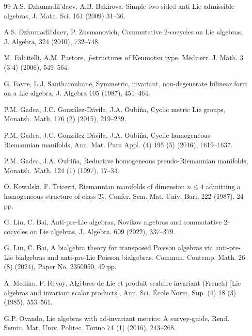 \documentclass[reqno]{amsart}
\theoremstyle{definition}
\begin{document}
\begin{thebibliography}{99}
 A.S. Dzhumadil'daev, A.B.  Bakirova, Simple two-sided anti-Lie-admissible algebras, J. Math. Sci. 161
(2009) 31--36.

 A.S. Dzhumadil'daev, P. Zusmanovich, Commutative 2-cocycles on Lie algebras, J. Algebra, 324 (2010), 732--748.

  M. Falcitelli, A.M. Pastore, $f$-structures of Kenmotsu type,
 Mediterr. J. Math. 3 (3-4) (2006), 549--564.

 G. Favre, L.J. Santharoubane, Symmetric, invariant, non-degenerate bilinear form on a Lie algebra, J. Algebra 105 (1987), 451--464.


 P.M. Gadea, J.C. Gonz\'{a}lez-D\'{a}vila, J.A. Oubi\~{n}a, Cyclic metric Lie groups,
Monatsh. Math. 176 (2) (2015), 219--239.

 P.M. Gadea, J.C. Gonz\'{a}lez-D\'{a}vila, J.A. Oubi\~{n}a, Cyclic homogeneous Riemannian manifolds, Ann. Mat. Pura Appl. (4) 195 (5) (2016),  1619--1637.

 P.M. Gadea, J.A. Oubi\~{n}a, Reductive homogeneous pseudo-Riemannian manifolds,
 Monatsh. Math. 124 (1) (1997), 17--34.

 O. Kowalski, F. Tricerri, Riemannian manifolds of dimension $n \leq 4$ admitting a homogeneous structure of class $T_{2}$,  Confer. Sem. Mat. Univ. Bari, 222 (1987), 24 pp.

 G. Liu, C. Bai, Anti-pre-Lie algebras, Novikov algebras and commutative 2-cocycles on Lie algebras, J. Algebra. 609 (2022), 337--379.

 G. Liu, C. Bai, A bialgebra theory for transposed Poisson algebras via anti-pre-Lie bialgebras and anti-pre-Lie Poisson bialgebras. Commun. Contemp. Math. 26 (8) (2024), Paper No. 2350050, 49 pp.

  A. Medina, P. Revoy, Alg\`{e}bres de Lie et produit scalaire invariant (French) [Lie algebras and invariant scalar products], Ann. Sci. \'{E}cole Norm. Sup. (4) 18 (3)
    (1985), 553--561.



 G.P. Ovando, Lie algebras with ad-invariant metrics: A survey-guide, Rend. Semin. Mat. Univ. Politec. Torino  74 (1) (2016),  243--268.


\end{thebibliography}
\end{document}
